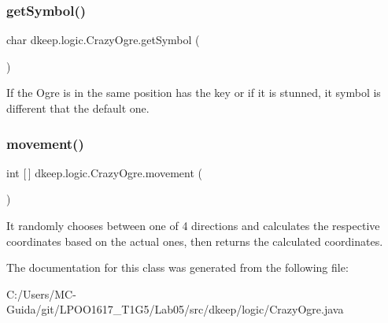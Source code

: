 \subsubsection{\texorpdfstring{get\+Symbol()}{getSymbol()}}
{\footnotesize\ttfamily char dkeep.\+logic.\+Crazy\+Ogre.\+get\+Symbol (\begin{DoxyParamCaption}{ }\end{DoxyParamCaption})}

If the Ogre is in the same position has the key or if it is stunned, it symbol is different that the default one. \mbox{\label{classdkeep_1_1logic_1_1_crazy_ogre_a4b12a877e7adb6af8b40d987f0b37e8c}} 
\subsubsection{\texorpdfstring{movement()}{movement()}}
{\footnotesize\ttfamily int \mbox{[}$\,$\mbox{]} dkeep.\+logic.\+Crazy\+Ogre.\+movement (\begin{DoxyParamCaption}{ }\end{DoxyParamCaption})}

It randomly chooses between one of 4 directions and calculates the respective coordinates based on the actual ones, then returns the calculated coordinates. 

The documentation for this class was generated from the following file\+:\begin{DoxyCompactItemize}
\item 
C\+:/\+Users/\+M\+C-\/\+Guida/git/\+L\+P\+O\+O1617\+\_\+\+T1\+G5/\+Lab05/src/dkeep/logic/Crazy\+Ogre.\+java\end{DoxyCompactItemize}

